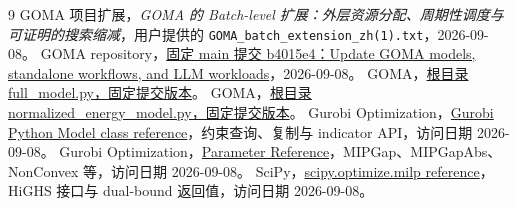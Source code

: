 \documentclass[UTF8,11pt,a4paper,fontset=fandol]{ctexart}
\theoremstyle{remark}\newtheorem{remark}[proposition]{说明}
\numberwithin{equation}{section}
\begin{document}
\begin{thebibliography}{9}
 GOMA 项目扩展，\emph{GOMA 的 Batch-level 扩展：外层资源分配、周期性调度与可证明的搜索缩减}，用户提供的 \texttt{GOMA\_batch\_extension\_zh(1).txt}，2026-09-08。
 GOMA repository，\href{https://github.com/ywlywl6/GOMA/commit/b4015e465d78a8dbeb25ec9220cfe7c34883a865}{固定 main 提交 b4015e4：Update GOMA models, standalone workflows, and LLM workloads}，2026-09-08。
 GOMA，\href{https://github.com/ywlywl6/GOMA/blob/b4015e465d78a8dbeb25ec9220cfe7c34883a865/full_model.py}{根目录 full\_model.py，固定提交版本}。
 GOMA，\href{https://github.com/ywlywl6/GOMA/blob/b4015e465d78a8dbeb25ec9220cfe7c34883a865/normalized_energy_model.py}{根目录 normalized\_energy\_model.py，固定提交版本}。
 Gurobi Optimization，\href{https://docs.gurobi.com/projects/optimizer/en/current/reference/python/model.html}{Gurobi Python Model class reference}，约束查询、复制与 indicator API，访问日期 2026-09-08。
 Gurobi Optimization，\href{https://docs.gurobi.com/projects/optimizer/en/current/reference/parameters.html}{Parameter Reference}，MIPGap、MIPGapAbs、NonConvex 等，访问日期 2026-09-08。
 SciPy，\href{https://docs.scipy.org/doc/scipy/reference/generated/scipy.optimize.milp.html}{scipy.optimize.milp reference}，HiGHS 接口与 dual-bound 返回值，访问日期 2026-09-08。
\end{thebibliography}
\end{document}
